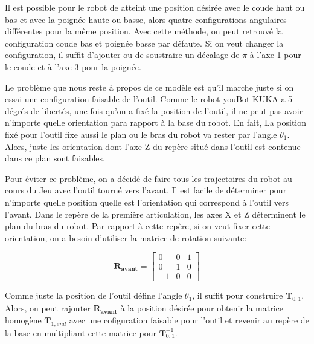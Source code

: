 Il est possible pour le robot de atteint une position désirée avec le coude haut ou bas et avec la poignée haute ou basse, alors quatre configurations angulaires différentes pour la même position. Avec cette méthode, on peut retrouvé la configuration coude bas et poignée basse par défaute. Si on veut changer la configuration, il suffit d'ajouter ou de soustraire un décalage de $ \pi $ à l'axe 1 pour le coude et à l'axe 3 pour la poignée.

Le problème que nous reste à propos de ce modèle est qu'il marche juste si on essai une configuration faisable de l'outil. Comme le robot youBot KUKA a 5 dégrés de libertés, une fois qu'on a fixé la position de l'outil, il ne peut pas avoir n'importe quelle orientation para rapport à la base du robot. En fait, La position fixé pour l'outil fixe aussi le plan ou le bras du robot va rester par l'angle $ \theta_1 $. Alors, juste les orientation dont l'axe Z du repère situé dans l'outil est contenue dans ce plan sont faisables.

Pour éviter ce problème, on a décidé de faire tous les trajectoires du robot au cours du Jeu avec l'outil tourné vers l'avant. Il est facile de déterminer pour n'importe quelle position quelle est l'orientation qui correspond à l'outil vers l'avant. Dans le repère de la première articulation, les axes X et Z déterminent le plan du bras du robot. Par rapport à cette repère, si on veut fixer cette orientation, on a besoin d'utiliser la matrice de rotation suivante:

\begin{equation*}
	\bm{R_{avant}} = \left[\begin{array}{ccc} 0 & 0 & 1 \\ 0 & 1 & 0 \\ -1 & 0 & 0 \end{array}\right]
\end{equation*}

Comme juste la position de l'outil défine l'angle $ \theta_1 $, il suffit pour construire $ \bm{T}_{0,1} $. Alors, on peut rajouter $ \bm{R_{avant}} $ à la position désirée pour obtenir la matrice homogène $ \bm{T}_{1,end} $ avec une cofiguration faisable pour l'outil et revenir au repère de la base en multipliant cette matrice pour $ \bm{T}_{0,1}^{-1} $.